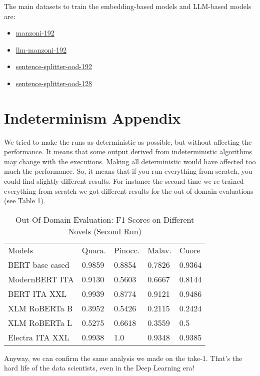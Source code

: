 \documentclass[11pt]{article}
\begin{document}
The main datasets to train the embedding-based models and LLM-based models are:

\begin{itemize}
	\item \href{https://huggingface.co/datasets/fax4ever/manzoni-192}{manzoni-192}
	\item \href{https://huggingface.co/datasets/fax4ever/llm-manzoni-192}{llm-manzoni-192}
    \item \href{https://huggingface.co/datasets/fax4ever/sentence-splitter-ood-192}{sentence-splitter-ood-192}
    \item \href{https://huggingface.co/datasets/fax4ever/sentence-splitter-ood-128}{sentence-splitter-ood-128}
\end{itemize}

\section{Indeterminism Appendix}
\label{sec:appendix3}
We tried to make the runs as deterministic as possible, but without affecting the
performance. \newline It means that some output derived from indeterministic algorithms may change with the executions. \newline Making all deterministic would have affected too much the performance. \newline So, it means that if you run everything from scratch, you could find slightly different results. \newline For instance the second time we re-trained everything from scratch we got different results for the out of domain evaluations (see Table \ref{t4}).
\begin{table}[]
	\small
	\caption{Out-Of-Domain Evaluation: F1 Scores on Different Novels (Second Run)}
	\begin{tabular}{lllll}
		Models & Quara. & Pinocc. & Malav. & Cuore \\
		BERT base cased & 0.9859      & 0.8854 & 0.7826        & 0.9364                 \\
		ModernBERT ITA  & 0.9130     & 0.5603   & 0.6667   & 0.8144                 \\
		BERT ITA XXL  & 0.9939     & 0.8774  & 0.9121     & 0.9486                 \\
		XLM RoBERTa B & 0.3952      & 0.5426   & 0.2115     & 0.2424                 \\
		XLM RoBERTa L & 0.5275       & 0.6618    & 0.3559   & 0.5               \\
		Electra ITA XXL  & 0.9938      & 1.0   & 0.9348    & 0.9385            
	\end{tabular}
	\label{t4}
\end{table}

Anyway, we can confirm the same analysis we made on the take-1.
That's the hard life of the data scientists, even in the Deep Learning era!


\end{document}
